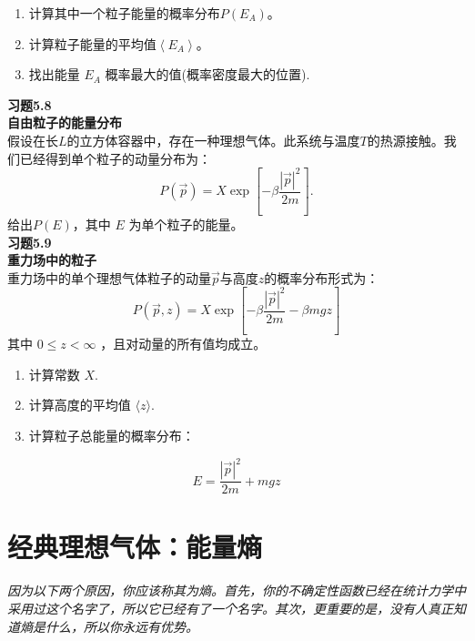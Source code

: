 \documentclass[UTF8]{ctexart}
\numberwithin{equation}{section}%
\numberwithin{figure}{section}%
\begin{document}
    \begin{enumerate}
      \item 计算其中一个粒子能量的概率分布$P\left(E_{A}\right)$。
    
      \item 计算粒子能量的平均值$\left\langle E_{A}\right\rangle$。
    
      \item 找出能量 $E_{A}$ 概率最大的值(概率密度最大的位置).
    
    \end{enumerate}
    \textbf{习题5.8}\label{prob5.8}\\
    \textbf{自由粒子的能量分布}\\
    假设在长$L$的立方体容器中，存在一种理想气体。此系统与温度$T$的热源接触。我们已经得到单个粒子的动量分布为：
    $$
    P(\vec{p})=X \exp \left[-\beta \frac{|\vec{p}|^{2}}{2 m}\right] .
    $$
    给出$P(E)$，其中 $E$ 为单个粒子的能量。\\
    \textbf{习题5.9}\label{prob5.9}\\
    \textbf{重力场中的粒子}\\
    重力场中的单个理想气体粒子的动量$\vec{p}$与高度$z$的概率分布形式为：
    $$
    P(\vec{p}, z)=X \exp \left[-\beta \frac{|\vec{p}|^{2}}{2 m}-\beta m g z\right]
    $$
    其中 $0 \leq z<\infty$ ，且对动量的所有值均成立。
    
    \begin{enumerate}
      \item 计算常数 $X$.
    
      \item 计算高度的平均值 $\langle z\rangle$.
    
      \item 计算粒子总能量的概率分布：
    
    \end{enumerate}
    $$
    E=\frac{|\vec{p}|^{2}}{2 m}+mgz
    $$
    \clearpage
    \section{经典理想气体：能量熵}\label{chap6}
    \textit{因为以下两个原因，你应该称其为熵。首先，你的不确定性函数已经在统计力学中采用过这个名字了，所以它已经有了一个名字。其次，更重要的是，没有人真正知道熵是什么，所以你永远有优势。\\
    \\}
    
\end{document}
